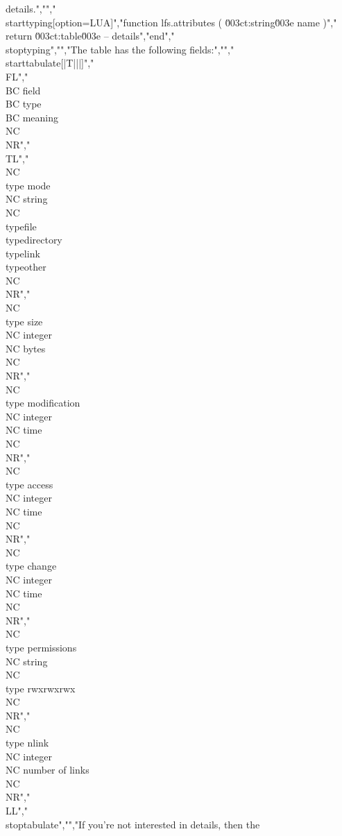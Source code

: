 details.","","\\starttyping[option=LUA]","function lfs.attributes ( \u003ct:string\u003e name )","    return \u003ct:table\u003e -- details","end","\\stoptyping","","The table has the following fields:","","\\starttabulate[|T|||]","\\FL","\\BC field                \\BC type    \\BC meaning \\NC \\NR","\\TL","\\NC \\type {mode}         \\NC string  \\NC \\type{file} \\type{directory} \\type{link} \\type{other} \\NC \\NR","\\NC \\type {size}         \\NC integer \\NC bytes \\NC \\NR","\\NC \\type {modification} \\NC integer \\NC time \\NC \\NR","\\NC \\type {access}       \\NC integer \\NC time \\NC \\NR","\\NC \\type {change}       \\NC integer \\NC time \\NC \\NR","\\NC \\type {permissions}  \\NC string  \\NC \\type {rwxrwxrwx} \\NC \\NR","\\NC \\type {nlink}        \\NC integer \\NC number of links \\NC \\NR","\\LL","\\stoptabulate","","If you're not interested in details, then the 